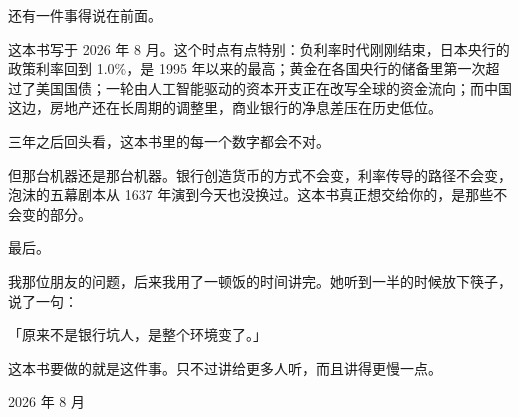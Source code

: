 \bookbreak

还有一件事得说在前面。

这本书写于 2026 年 8 月。这个时点有点特别：负利率时代刚刚结束，日本央行的政策利率回到 1.0\%，是 1995 年以来的最高；黄金在各国央行的储备里第一次超过了美国国债；一轮由人工智能驱动的资本开支正在改写全球的资金流向；而中国这边，房地产还在长周期的调整里，商业银行的净息差压在历史低位。

三年之后回头看，这本书里的每一个数字都会不对。

但那台机器还是那台机器。银行创造货币的方式不会变，利率传导的路径不会变，泡沫的五幕剧本从 1637 年演到今天也没换过。这本书真正想交给你的，是那些不会变的部分。

\bookbreak

最后。

我那位朋友的问题，后来我用了一顿饭的时间讲完。她听到一半的时候放下筷子，说了一句：

「原来不是银行坑人，是整个环境变了。」

这本书要做的就是这件事。只不过讲给更多人听，而且讲得更慢一点。

\vspace{1em}
\noindent\hfill{\kaishu\color{inkgray} 2026 年 8 月}

\cleardoublepage
